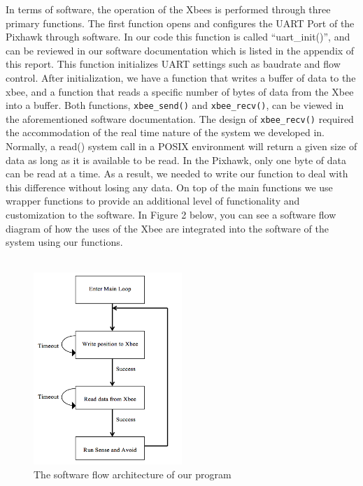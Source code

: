 \documentclass[12pt]{article}
\begin{document}
In terms of software, the operation of the Xbees is performed through three primary functions. The first function opens and configures the UART Port of the Pixhawk through software. In our code this function is called “uart\_init()”, and can be reviewed in our software documentation which is listed in the appendix of this report. This function initializes UART settings such as baudrate and flow control. After initialization, we have a function that writes a buffer of data to the xbee, and a function that reads a specific number of bytes of data from the Xbee into a buffer. Both functions, \texttt{xbee\_send()} and \texttt{xbee\_recv()}, can be viewed in the aforementioned software documentation. The design of \texttt{xbee\_recv()} required the accommodation of the real time nature of the system we developed in. Normally, a read() system call in a POSIX environment will return a given size of data as long as it is available to be read. In the Pixhawk, only one byte of data can be read at a time. As a result, we needed to write our function to deal with this difference without losing any data. On top of the main functions we use wrapper functions to provide an additional level of functionality and customization to the software. In Figure 2 below, you can see a software flow diagram of how the uses of the Xbee are integrated into the software of the system using our functions.\\\\

\begin{figure}[ht!]
   \centering
   \includegraphics[width=0.5\textwidth]{flow.png}
   \caption{The software flow architecture of our program}
\end{figure}
\end{document}

